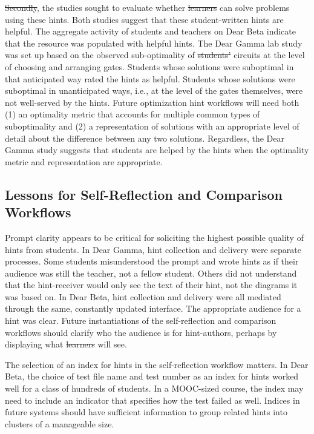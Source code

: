 \documentclass[12pt,twoside]{mitthesis}
\providecommand{\DIFaddtex}[1]{{\protect\color{blue}\uwave{#1}}} %
\providecommand{\DIFdeltex}[1]{{\protect\color{red}\sout{#1}}}                      %
\providecommand{\DIFaddbegin}{} %
\providecommand{\DIFaddend}{} %
\providecommand{\DIFdelbegin}{} %
\providecommand{\DIFdelend}{} %
\providecommand{\DIFadd}[1]{\texorpdfstring{\DIFaddtex{#1}}{#1}} %
\providecommand{\DIFdel}[1]{\texorpdfstring{\DIFdeltex{#1}}{}} %
\begin{document}
\DIFdelbegin \DIFdel{Secondly}\DIFdelend \DIFaddbegin \DIFadd{Second}\DIFaddend , the studies sought to evaluate whether \DIFdelbegin \DIFdel{learners }\DIFdelend \DIFaddbegin \DIFadd{students }\DIFaddend can solve problems using these hints. Both studies suggest that these student-written hints are helpful. The aggregate activity of students and teachers on Dear Beta indicate that the resource was populated with helpful hints. The Dear Gamma lab study was set up based on the observed sub-optimality of \DIFdelbegin \DIFdel{students' }\DIFdelend \DIFaddbegin \DIFadd{student }\DIFaddend circuits at the level of choosing and arranging gates. Students whose solutions were suboptimal in that anticipated way rated the hints as helpful. Students whose solutions were suboptimal in unanticipated ways, i.e., at the level of the gates themselves, were not well-served by the hints. Future optimization hint workflows will need both (1) an optimality metric that accounts for multiple common types of suboptimality and (2) a representation of solutions with an appropriate level of detail about the difference between any two solutions. Regardless, the Dear Gamma study suggests that students are helped by the hints when the optimality metric and representation are appropriate.

\subsection{Lessons for Self-Reflection and Comparison Workflows}

Prompt clarity appears to be critical for soliciting the highest possible quality of hints from students. In Dear Gamma, hint collection and delivery were separate processes. Some students misunderstood the prompt and wrote hints as if their audience was still the teacher, not a fellow student. Others did not understand that the hint-receiver would only see the text of their hint, not the diagrams it was based on. In Dear Beta, hint collection and delivery were all mediated through the same, constantly updated interface. The appropriate audience for a hint was clear. Future instantiations of the self-reflection and comparison workflows should clarify who the audience is for hint-authors, perhaps by displaying what \DIFdelbegin \DIFdel{learners }\DIFdelend \DIFaddbegin \DIFadd{students }\DIFaddend will see. 

The selection of an index for hints in the self-reflection workflow matters. In Dear Beta, the choice of test file name and test number as an index for hints worked well for a class of hundreds of students. In a MOOC-sized course, the index may need to include an indicator that specifies how the test failed as well. Indices in future systems should have sufficient information to group related hints into clusters of a manageable size.
\end{document}
